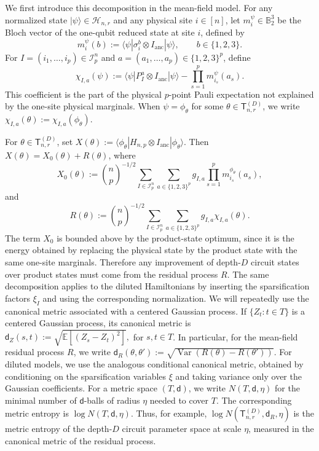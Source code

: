 \documentclass[12pt]{article}
\newcommand{\E}{\mathbb{E}}
\newcommand{\B}{\mathbb{B}}
\newcommand{\mcH}{\mathcal{H}}
\newcommand{\mcI}{\mathcal{I}}
\begin{document}
We first introduce this decomposition in the mean-field model. For any normalized
state \(|\psi\rangle\in\mcH_{n,r}\) and any physical site \(i\in[n]\), let
\(m_i^\psi\in \B_2^3\) be the Bloch vector of the one-qubit reduced state at
site \(i\), defined by
\[
    m_i^\psi(b)
    :=
    \langle\psi|\sigma_i^b\otimes I_{\mathrm{anc}}|\psi\rangle,
    \qquad b\in\{1,2,3\}.
\]
For \(I=(i_1,\dots,i_p)\in\mcI_p^n\) and
\(a=(a_1,\dots,a_p)\in\{1,2,3\}^p\), define
\[
    \chi_{I,a}(\psi)
    :=
    \langle\psi|P_I^a\otimes I_{\mathrm{anc}}|\psi\rangle
    -
    \prod_{s=1}^p m_{i_s}^{\psi}(a_s).
\]
This coefficient is the part of the physical \(p\)-point Pauli expectation not
explained by the one-site physical marginals. When
\(\psi=\phi_\theta\) for some \(\theta\in\mathsf{T}_{n,r}^{(D)}\), we write
\(\chi_{I,a}(\theta):=\chi_{I,a}(\phi_\theta)\).

For \(\theta\in\mathsf{T}_{n,r}^{(D)}\), set $X(\theta)
    :=
    \langle\phi_\theta|
    H_{n,p}\otimes I_{\mathrm{anc}}
    |\phi_\theta\rangle $. Then $X(\theta)=X_0(\theta)+R(\theta)$, where
\[
    X_0(\theta)
    :=
    \binom np^{-1/2}
    \sum_{I\in\mcI_p^n}
    \sum_{a\in\{1,2,3\}^p}
    g_{I,a}
    \prod_{s=1}^p m_{i_s}^{\phi_\theta}(a_s),
\]
and
\[
    R(\theta)
    :=
    \binom np^{-1/2}
    \sum_{I\in\mcI_p^n}
    \sum_{a\in\{1,2,3\}^p}
    g_{I,a}\chi_{I,a}(\theta).
\]
The term \(X_0\) is bounded above by the product-state optimum, since it is the energy obtained by replacing the physical state by the product state with the same one-site marginals. Therefore any improvement of depth-\(D\) circuit states over product states must come from the residual process \(R\). The same decomposition applies to the diluted Hamiltonians by inserting the
sparsification factors \(\xi_I\) and using the corresponding normalization.
We will repeatedly use the canonical metric associated with a centered
Gaussian process. If \(\{Z_t:t\in T\}\) is a centered Gaussian process, its
canonical metric is $\mathsf{d}_Z(s,t) := \sqrt{\E[(Z_s-Z_t)^2]},$ for $s,t\in T$. In particular, for the mean-field residual process \(R\), we write $\mathsf{d}_R(\theta,\theta')
    :=
    \sqrt{\operatorname{Var}(R(\theta)-R(\theta')) }$.
For diluted models, we use the analogous conditional canonical metric, obtained
by conditioning on the sparsification variables \(\xi\) and taking variance
only over the Gaussian coefficients. For a metric space \((T,\mathsf d)\), we write \(N(T,\mathsf d,\eta)\) for the minimal number of \(\mathsf d\)-balls of radius \(\eta\) needed to cover \(T\). The corresponding metric entropy is $\log N(T,\mathsf d,\eta)$. Thus, for example, $\log N(\mathsf{T}_{n,r}^{(D)},\mathsf d_R,\eta)$ is the metric entropy of the depth-\(D\) circuit parameter space at scale
\(\eta\), measured in the canonical metric of the residual process.
\end{document}

